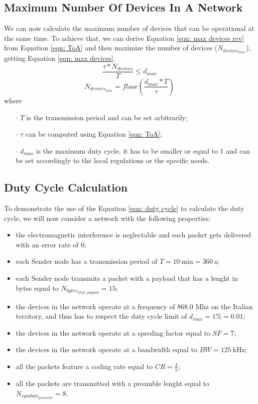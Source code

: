 \subsection{Maximum Number Of Devices In A Network}
We can now calculate the maximum number of devices that can be operational at the same time. To achieve that, we can
derive Equation \ref{eqn: max devices rev} from Equation \ref{eqn: ToA} and then maximize the number of devices
($\mathit{N_{devices_{max}}}$), getting Equation \ref{eqn: max devices}.
\begin{equation}
    \label{eqn: max devices rev}
    \frac{\tau * \mathit{N_{devices}}}{T} \leq \mathit{d_{max}}
\end{equation}
\begin{equation}
    \label{eqn: max devices}
    N_{devices_{max}} = \textit{floor} \left( \frac{\mathit{d_{max}} * T}{\tau} \right)
\end{equation}
where
\begin{itemize}[noitemsep,nolistsep]
    \item[\boldmath$\cdot$] $T$ is the transmission period and can be set arbitrarily;
    \item[\boldmath$\cdot$] $\tau$ can be computed using Equation \ref{eqn: ToA};
    \item[\boldmath$\cdot$] $\mathit{d_{max}}$ is the maximum duty cycle, it has to be smaller or equal to 1 and can be
        set accordingly to the local regulations or the specific needs.
\end{itemize}

\subsection{Duty Cycle Calculation}
To demonstrate the use of the Equation \ref{eqn: duty cycle} to calculate the duty cycle, we will now consider a network
with the following properties:
\begin{itemize}
    \item the electromagnetic interference is neglectable and each packet gets delivered with an error rate of 0;
    \item each Sender node has a transmission period of $T = 10\ \mathrm{ min} = 360\ \mathrm{s}$;
    \item each Sender node transmits a packet with a payload that has a lenght in bytes equal to
        $\mathit{N_{bytes_{MAC\_payload}}} = 15$;
    \item the devices in the network operate at a frequency of 868.0 Mhz on the Italian territory, and thus has to
        respect the duty cycle limit of $\mathit{d_{max}} = 1\% = 0.01$;
    \item the devices in the network operate at a spreding factor equal to $\mathit{SF} = 7$;
    \item the devices in the network operate at a bandwidth equal to $\mathit{BW} = 125\ \mathrm{kHz}$;
    \item all the packets feature a coding rate equal to $\mathit{CR} = \frac{4}{5}$;
    \item all the packets are transmitted with a preamble lenght equal to $\mathit{N_{symbols_{preamble}}} = 8$.
\end{itemize}

